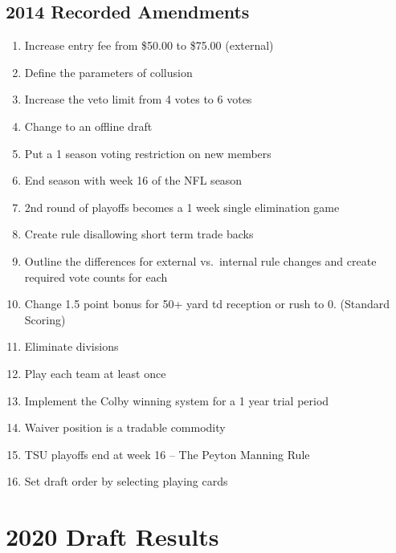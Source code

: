 \documentclass[
]{book}
\providecommand{\tightlist}{%
  \setlength{\itemsep}{0pt}\setlength{\parskip}{0pt}}
\begin{document}
\hypertarget{recorded-amendments-7}{%
\section{2014 Recorded Amendments}\label{recorded-amendments-7}}

\begin{enumerate}
\def\labelenumi{\arabic{enumi}.}
\tightlist
\item
  Increase entry fee from \$50.00 to \$75.00 (external)
\item
  Define the parameters of collusion
\item
  Increase the veto limit from 4 votes to 6 votes
\item
  Change to an offline draft
\item
  Put a 1 season voting restriction on new members
\item
  End season with week 16 of the NFL season
\item
  2nd round of playoffs becomes a 1 week single elimination game
\item
  Create rule disallowing short term trade backs
\item
  Outline the differences for external vs.~internal rule changes and create required vote counts for each
\item
  Change 1.5 point bonus for 50+ yard td reception or rush to 0. (Standard Scoring)
\item
  Eliminate divisions
\item
  Play each team at least once
\item
  Implement the Colby winning system for a 1 year trial period
\item
  Waiver position is a tradable commodity
\item
  TSU playoffs end at week 16 -- The Peyton Manning Rule
\item
  Set draft order by selecting playing cards
\end{enumerate}

\hypertarget{draft-results}{%
\chapter{2020 Draft Results}\label{draft-results}}

  
\end{document}
